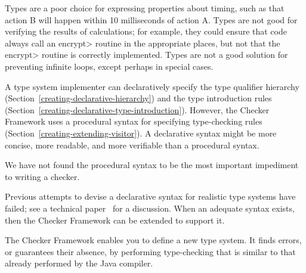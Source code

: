 Types are a poor choice for expressing properties about timing, such as
that action B will happen within 10 milliseconds of action A.  Types are
not good for verifying the results of calculations; for example, they could
ensure that code always call an \<encrypt> routine in the appropriate
places, but not that the \<encrypt> routine is correctly implemented.
Types are not a good solution for preventing infinite loops, except perhaps
in special cases.



A type system implementer can declaratively specify the type qualifier
hierarchy (Section~\ref{creating-declarative-hierarchy}) and the type introduction rules
(Section~\ref{creating-declarative-type-introduction}).  However, the Checker
Framework uses a procedural syntax for specifying type-checking
rules (Section~\ref{creating-extending-visitor}).
A declarative syntax might be more concise, more readable, and more
verifiable than a procedural syntax.

We have not found the procedural syntax to be the most important impediment
to writing a checker.

Previous attempts to devise a declarative syntax
for realistic type systems have failed; see a technical
paper~\cite{PapiACPE2008} for a discussion.  When an
adequate syntax exists, then the Checker Framework can be extended to
support it.





The Checker Framework enables you to define a new type system.  It finds
errors, or guarantees their absence, by performing type-checking that is
similar to that already performed by the Java compiler.

